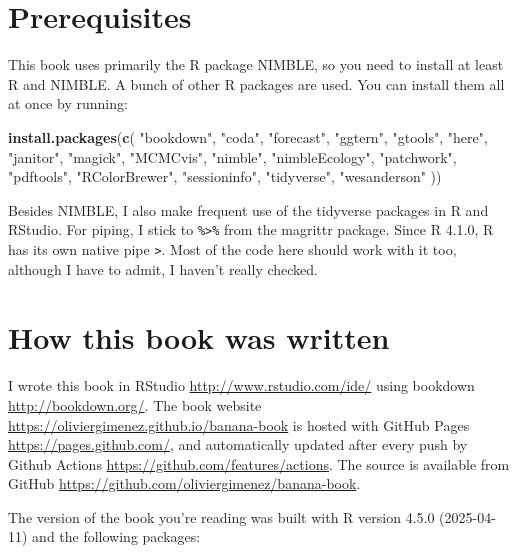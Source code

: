 \documentclass[
  12pt,
]{krantz}
\newenvironment{Shaded}{\begin{snugshade}}{\end{snugshade}}
\newcommand{\FunctionTok}[1]{\textcolor[rgb]{0.13,0.29,0.53}{\textbf{#1}}}
\newcommand{\NormalTok}[1]{#1}
\newcommand{\StringTok}[1]{\textcolor[rgb]{0.31,0.60,0.02}{#1}}
\begin{document}
\section*{Prerequisites}\label{prerequisites}


This book uses primarily the R package NIMBLE, so you need to install at least R and NIMBLE. A bunch of other R packages are used. You can install them all at once by running:

\begin{Shaded}
\begin{Highlighting}[]
\FunctionTok{install.packages}\NormalTok{(}\FunctionTok{c}\NormalTok{(}
  \StringTok{"bookdown"}\NormalTok{, }\StringTok{"coda"}\NormalTok{, }\StringTok{"forecast"}\NormalTok{, }\StringTok{"ggtern"}\NormalTok{, }\StringTok{"gtools"}\NormalTok{, }
  \StringTok{"here"}\NormalTok{, }\StringTok{"janitor"}\NormalTok{, }\StringTok{"magick"}\NormalTok{, }\StringTok{"MCMCvis"}\NormalTok{, }\StringTok{"nimble"}\NormalTok{, }
  \StringTok{"nimbleEcology"}\NormalTok{, }\StringTok{"patchwork"}\NormalTok{, }\StringTok{"pdftools"}\NormalTok{, }
  \StringTok{"RColorBrewer"}\NormalTok{, }\StringTok{"sessioninfo"}\NormalTok{, }\StringTok{"tidyverse"}\NormalTok{, }
  \StringTok{"wesanderson"} 
\NormalTok{))}
\end{Highlighting}
\end{Shaded}

Besides NIMBLE, I also make frequent use of the tidyverse packages in R and RStudio. For piping, I stick to \texttt{\%\textgreater{}\%} from the magrittr package. Since R 4.1.0, R has its own native pipe \texttt{\textbar{}\textgreater{}}. Most of the code here should work with it too, although I have to admit, I haven't really checked.

\section*{How this book was written}\label{how-this-book-was-written}


I wrote this book in RStudio \url{http://www.rstudio.com/ide/} using bookdown \url{http://bookdown.org/}. The book website \url{https://oliviergimenez.github.io/banana-book} is hosted with GitHub Pages \url{https://pages.github.com/}, and automatically updated after every push by Github Actions \url{https://github.com/features/actions}. The source is available from GitHub \url{https://github.com/oliviergimenez/banana-book}.

The version of the book you're reading was built with R version 4.5.0 (2025-04-11) and the following packages:
\end{document}
